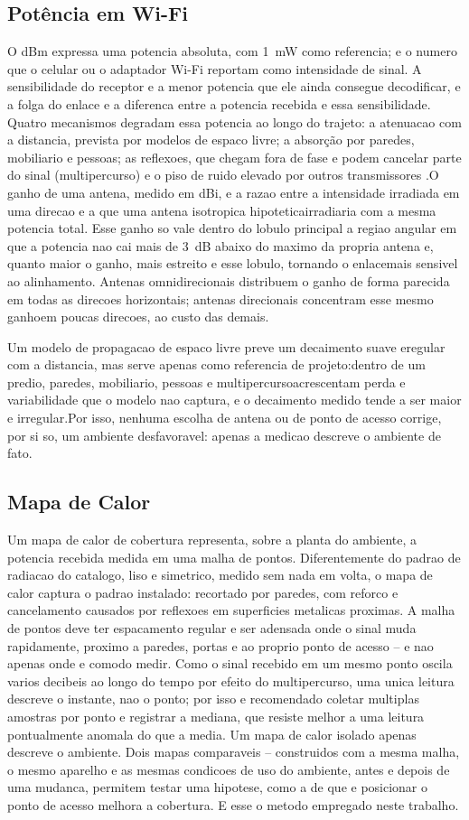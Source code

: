 \subsection{Potência em Wi-Fi}
O dBm expressa uma potencia absoluta, com 1~mW como referencia; e o numero que o celular ou o adaptador Wi-Fi reportam como intensidade de sinal. A sensibilidade do receptor e a menor
potencia que ele ainda consegue decodificar, e a folga do enlace e a diferenca entre a potencia recebida e essa sensibilidade. Quatro mecanismos degradam essa potencia ao
longo do trajeto: a atenuacao com a distancia, prevista por modelos de espaco livre; a absorção por paredes, mobiliario e pessoas; as reflexoes, que chegam fora de fase e podem cancelar parte do sinal (multipercurso) e o piso de ruido elevado por outros transmissores .O ganho de uma antena, medido em dBi, e a razao entre a intensidade irradiada em uma direcao e a que uma antena isotropica hipoteticairradiaria com a mesma potencia total. Esse ganho so vale dentro do lobulo principal a regiao angular em que a potencia nao cai mais de 3~dB abaixo do maximo da propria antena e, quanto maior o ganho, mais estreito e esse lobulo, tornando o enlacemais sensivel ao alinhamento. Antenas
omnidirecionais distribuem o ganho de forma parecida em todas as
direcoes horizontais; antenas direcionais concentram esse mesmo ganhoem poucas direcoes, ao custo das demais.

Um modelo de propagacao de espaco livre preve um decaimento suave eregular com a distancia, mas serve apenas como referencia de projeto:dentro de um predio, paredes, mobiliario, pessoas e multipercursoacrescentam perda e variabilidade que o modelo nao captura, e o
decaimento medido tende a ser maior e irregular.Por isso, nenhuma escolha de antena ou de ponto de acesso corrige, por
si so, um ambiente desfavoravel: apenas a medicao descreve o ambiente
de fato.
\subsection{Mapa de Calor}
Um mapa de calor de cobertura representa, sobre a planta do ambiente, a potencia recebida medida em uma malha de pontos. Diferentemente do padrao de radiacao do catalogo, liso e simetrico, medido sem nada em volta, o mapa de calor captura o padrao instalado: recortado por paredes, com reforco e cancelamento causados por reflexoes em superficies metalicas proximas. A malha de pontos deve ter espacamento regular e ser adensada onde o sinal muda rapidamente, proximo a
paredes, portas e ao proprio ponto de acesso -- e nao apenas onde e comodo medir. Como o sinal recebido em um mesmo ponto oscila varios decibeis ao longo do tempo por efeito do multipercurso, uma unica leitura descreve o instante, nao o ponto; por isso e recomendado
coletar multiplas amostras por ponto e registrar a mediana, que
resiste melhor a uma leitura pontualmente anomala do que a media.
Um mapa de calor isolado apenas descreve o ambiente. Dois mapas
comparaveis -- construidos com a mesma malha, o mesmo aparelho e as mesmas condicoes de uso do ambiente, antes e depois de uma mudanca, permitem testar uma hipotese, como a de que e posicionar o ponto de acesso melhora a cobertura. E esse o metodo empregado neste trabalho.